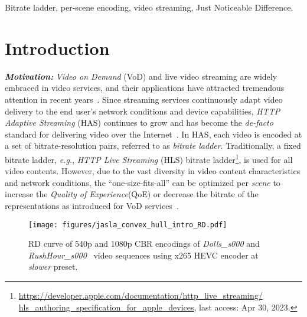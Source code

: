 \documentclass{article}
\newcommand{\eg}{\emph{e.g.}, }
\newcommand{\HAS}{\emph{HTTP Adaptive Streaming }}
\newcommand{\VOD}{\emph{Video on Demand }}
\newcommand{\UHD}{\emph{Ultra High Definition }}
\newcommand{\HLS}{\emph{HTTP Live Streaming }}
\newcommand{\QoE}{\emph{Quality of Experience}\xspace}
\begin{document}
\begin{keywords}
Bitrate ladder, per-scene encoding, video streaming, Just Noticeable Difference.
\end{keywords}
\vspace{-0.5em}
\section{Introduction}
\vspace{-0.75em}
\textbf{\textit{Motivation:}} \VOD (VoD) and live video streaming are widely embraced in video services, and their applications have attracted tremendous attention in recent years~\cite{index2019cisco}. %
Since streaming services continuously adapt video delivery to the end user's network conditions and device capabilities, \HAS (HAS) continues to grow and has become the \textit{de-facto} standard for delivering video over the Internet~\cite{Bentaleb2019}. In HAS, each video is encoded at a set of bitrate-resolution pairs, referred to as \emph{bitrate ladder}. Traditionally, a fixed bitrate ladder, \eg \HLS (HLS) bitrate ladder\footnote{\label{apple_hls_ref}\href{https://developer.apple.com/documentation/http\_live\_streaming/hls\_authoring\_specification\_for\_apple\_devices}{https://developer.apple.com/documentation/http\_live\_streaming/ hls\_authoring\_specification\_for\_apple\_devices}, last access: Apr 30, 2023.}, is used for all video contents. However, due to the vast diversity in video content characteristics and network conditions, the ``one-size-fits-all'' can be optimized per \textit{scene} to increase the \QoE (QoE) or decrease the bitrate of the representations as introduced for VoD services~\cite{netflix_paper}. 
\begin{figure}[t]
    \centering
    \texttt{[image: figures/jasla\_convex\_hull\_intro\_RD.pdf]}
\vspace{-0.3em}
\caption{RD curve of 540p and 1080p CBR encodings of \textit{Dolls\_s000} and \textit{RushHour\_s000}~\cite{VCD_ref} video sequences using x265 HEVC encoder at \textit{slower} preset.}
\vspace{-1.0em}
\label{fig:convex_hull_motive}
\end{figure}
\end{document}
